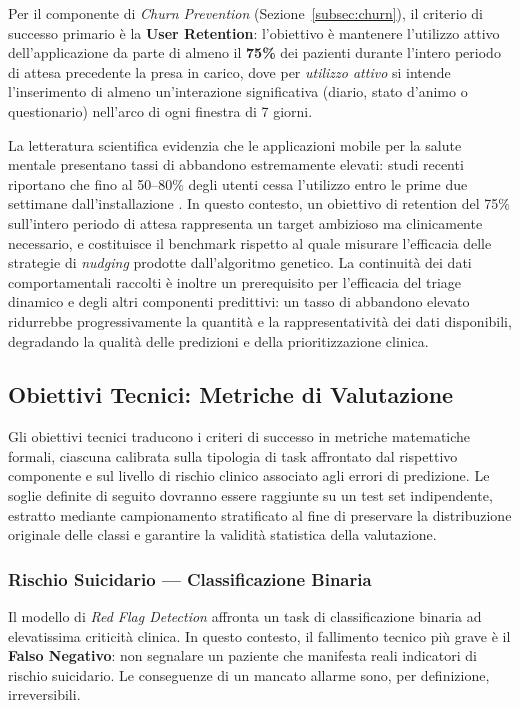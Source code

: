Per il componente di \textit{Churn Prevention} (Sezione~\ref{subsec:churn}), il criterio di successo primario è la \textbf{User Retention}: l'obiettivo è mantenere l'utilizzo attivo dell'applicazione da parte di almeno il \textbf{75\%} dei pazienti durante l'intero periodo di attesa precedente la presa in carico, dove per \textit{utilizzo attivo} si intende l'inserimento di almeno un'interazione significativa (diario, stato d'animo o questionario) nell'arco di ogni finestra di 7 giorni.

La letteratura scientifica evidenzia che le applicazioni mobile per la salute mentale presentano tassi di abbandono estremamente elevati: studi recenti riportano che fino al 50--80\% degli utenti cessa l'utilizzo entro le prime due settimane dall'installazione \cite{baumel2019mhealth}. In questo contesto, un obiettivo di retention del 75\% sull'intero periodo di attesa rappresenta un target ambizioso ma clinicamente necessario, e costituisce il benchmark rispetto al quale misurare l'efficacia delle strategie di \textit{nudging} prodotte dall'algoritmo genetico. La continuità dei dati comportamentali raccolti è inoltre un prerequisito per l'efficacia del triage dinamico e degli altri componenti predittivi: un tasso di abbandono elevato ridurrebbe progressivamente la quantità e la rappresentatività dei dati disponibili, degradando la qualità delle predizioni e della prioritizzazione clinica.

\subsection{Obiettivi Tecnici: Metriche di Valutazione}
\label{subsec:metriche_ml}

Gli obiettivi tecnici traducono i criteri di successo in metriche matematiche formali, ciascuna calibrata sulla tipologia di task affrontato dal rispettivo componente e sul livello di rischio clinico associato agli errori di predizione. Le soglie definite di seguito dovranno essere raggiunte su un test set indipendente, estratto mediante campionamento stratificato al fine di preservare la distribuzione originale delle classi e garantire la validità statistica della valutazione.

\subsubsection{Rischio Suicidario --- Classificazione Binaria}
\label{subsubsec:metriche_redflag}

Il modello di \textit{Red Flag Detection} affronta un task di classificazione binaria ad elevatissima criticità clinica. In questo contesto, il fallimento tecnico più grave è il \textbf{Falso Negativo}: non segnalare un paziente che manifesta reali indicatori di rischio suicidario. Le conseguenze di un mancato allarme sono, per definizione, irreversibili.

